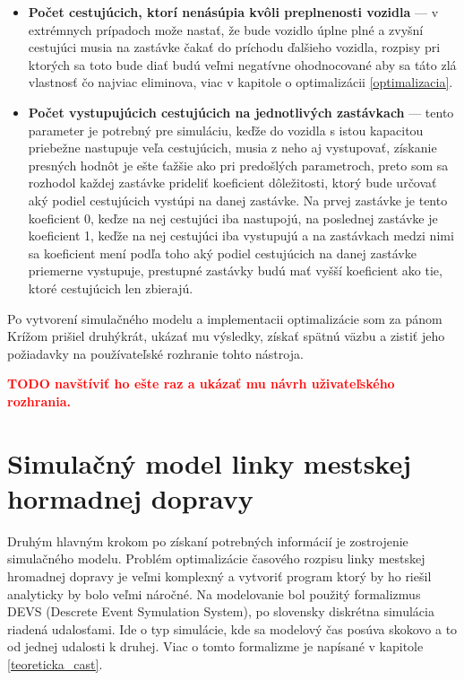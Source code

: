 \begin{itemize}
  \item \textbf{Počet cestujúcich, ktorí nenásúpia kvôli preplnenosti vozidla} --- v extrémnych prípadoch može nastať, že bude vozidlo úplne plné a zvyšní cestujúci musia na zastávke čakať do príchodu ďalšieho vozidla, rozpisy pri ktorých sa toto bude diať budú veľmi negatívne ohodnocované aby sa táto zlá vlastnosť čo najviac eliminova, viac v kapitole o optimalizácii \ref{optimalizacia}.
  \item \textbf{Počet vystupujúcich cestujúcich na jednotlivých zastávkach} --- tento parameter je potrebný pre simuláciu, keďže do vozidla s istou kapacitou priebežne nastupuje veľa cestujúcich, musia z neho aj vystupovať, získanie presných hodnôt je ešte ťažšie ako pri predošlých parametroch, preto som sa rozhodol každej zastávke prideliť koeficient dôležitosti, ktorý bude určovať aký podiel cestujúcich vystúpi na danej zastávke. Na prvej zastávke je tento koeficient 0, keďze na nej cestujúci iba nastupojú, na poslednej zastávke je koeficient 1, keďže na nej cestujúci iba vystupujú a na zastávkach medzi nimi sa koeficient mení podľa toho aký podiel cestujúcich na danej zastávke priemerne vystupuje, prestupné zastávky budú mať vyšší koeficient ako tie, ktoré cestujúcich len zbierajú.
\end{itemize}

Po vytvorení simulačného modelu a implementacii optimalizácie som za pánom Krížom prišiel druhýkrát, ukázať mu výsledky, získať spätnú väzbu a zistiť jeho požiadavky na používateľské rozhranie tohto nástroja.

\textbf{\textcolor{red}{TODO navštíviť ho ešte raz a ukázať mu návrh uživateľského rozhrania.}}

\chapter{Simulačný model linky mestskej hormadnej dopravy} %
\label{simulacny_model}

Druhým hlavným krokom po získaní potrebných informácií je zostrojenie simulačného modelu.
Problém optimalizácie časového rozpisu linky mestskej hromadnej dopravy je veľmi komplexný a vytvoriť program ktorý by ho riešil analyticky by bolo veľmi náročné.
Na modelovanie bol použitý formalizmus DEVS (Descrete Event Symulation System), po slovensky diskrétna simulácia riadená udalosťami.
Ide o typ simulácie, kde sa modelový čas posúva skokovo a to od jednej udalosti k druhej.
Viac o tomto formalizme je napísané v kapitole \ref{teoreticka_cast}.

